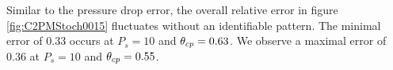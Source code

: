 Similar to the pressure drop error, the overall relative error in figure \ref{fig:C2PMStoch0015} fluctuates without an identifiable pattern.
The minimal error of $0.33$ occurs at $P_s = 10$ and $\theta_{cp} = 0.63$.
We observe a maximal error of $0.36$ at $P_s = 10$ and $\theta_{cp} = 0.55$.


